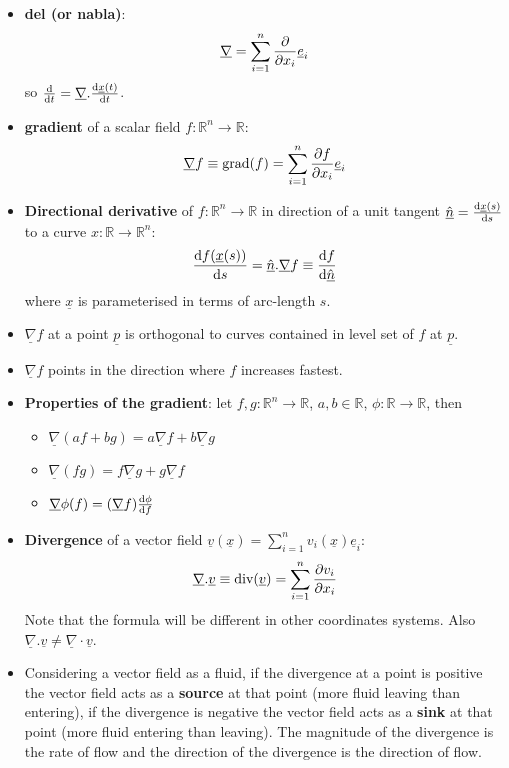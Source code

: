 \begin{itemize}
\begin{itemize}
	\end{itemize}
	\item \textbf{del (or nabla)}:
	\[
		\underline{\nabla} = \sum_{i = 1}^n \diffp{}{x_i} \underline{e}_i
	\]
	so $\diff{}{t} = \underline{\nabla} . \diff{\underline{x}(t)}{t}$.
	\item \textbf{gradient} of a scalar field $f: \mathbb{R}^n \to \mathbb{R}$:
	\[
		\underline{\nabla} f \equiv \text{grad}(f) = \sum_{i = 1}^n \diffp{f}{x_i} \underline{e}_i
	\]
	\item \textbf{Directional derivative} of $f: \mathbb{R}^n \to \mathbb{R}$ in direction of a unit tangent $\underline{\hat{n}} = \diff{\underline{x}(s)}{s}$ to a curve $x: \mathbb{R} \to \mathbb{R}^n$:
	\[
		\diff{f(\underline{x}(s))}{s} = \underline{\hat{n}} . \underline{\nabla} f \equiv \diff{f}{\underline{\hat{n}}}
	\]
	where $\underline{x}$ is parameterised in terms of arc-length $s$.
	\item $\underline{\nabla} f$ at a point $\underline{p}$ is orthogonal to curves contained in level set of $f$ at $\underline{p}$.
	\item $\underline{\nabla} f$ points in the direction where $f$ increases fastest.
	\item \textbf{Properties of the gradient}: let $f, g: \mathbb{R}^n \to \mathbb{R}$, $a, b \in \mathbb{R}$, $\phi: \mathbb{R} \to \mathbb{R}$, then
	\begin{itemize}
		\item $\underline{\nabla} (af + bg) = a \underline{\nabla} f + b \underline{\nabla} g$
		\item $\underline{\nabla} (fg) = f \underline{\nabla} g + g \underline{\nabla} f$
		\item $\underline{\nabla} \phi(f) = (\underline{\nabla} f) \diff{\phi}{f}$
	\end{itemize}
	\item \textbf{Divergence} of a vector field $\underline{v}(\underline{x}) = \sum_{i = 1}^n v_i(\underline{x}) \underline{e}_i$:
	\[
		\underline{\nabla} . \underline{v} \equiv \text{div}(\underline{v}) = \sum_{i = 1}^n \diffp{v_i}{x_i}
	\]
	Note that the formula will be different in other coordinates systems. Also $\underline{\nabla} . \underline{v} \ne \underline{\nabla} \cdot \underline{v}$.
	\item Considering a vector field as a fluid, if the divergence at a point is positive the vector field acts as a \textbf{source} at that point (more fluid leaving than entering), if the divergence is negative the vector field acts as a \textbf{sink} at that point (more fluid entering than leaving). The magnitude of the divergence is the rate of flow and the direction of the divergence is the direction of flow.

\end{itemize}

